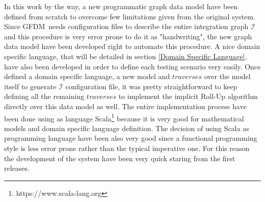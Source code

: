 \documentclass[12pt,a4paper]{report}
\newcommand\systemName{GFDM}
\newcommand\integrationGraph{\mathcal{I}}
\begin{document}
In this work by the way, a new programmatic graph data model have been defined from scratch to overcome few limitations given from the original system.
%
Since \systemName\, needs configuration files to describe the entire integration graph $\integrationGraph$ and this procedure is very error prone to do it as "handwriting", the new graph data model have been developed right to automate this procedure.
%
A nice domain specific language, that will be detailed in section \ref{Domain Specific Language}, have also been developed in order to define each testing scenario very easily.
%
Once defined a domain specific language, a new model and $traverses$ over the model itself to generate $\integrationGraph$ configuration file, it was pretty straightforward to keep defining all the remaining $traverses$ to implement the implicit Roll-Up algorithm directly over this data model as well.
%
The entire implementation process have been done using as language Scala\footnote{https://www.scala-lang.org} because it is very good for mathematical models and domain specific language definition.
%
The decision of using Scala as programming language have been also very good since a functional programming style is less error prone rather than the typical imperative one.
%
For this reason the development of the system have been very quick staring from the first releases.
\end{document}
